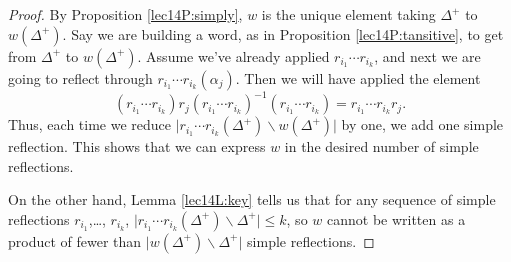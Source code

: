  \begin{proof}
   By Proposition \ref{lec14P:simply}, $w$ is the unique element taking $\Delta^+$ to
   $w(\Delta^+)$. Say we are building a word, as in Proposition
   \ref{lec14P:tansitive}, to get from $\Delta^+$ to $w(\Delta^+)$. Assume we've
   already applied $r_{i_1}\cdots r_{i_k}$, and next we are going to reflect through
   $r_{i_1}\cdots r_{i_k}(\alpha_j)$. Then we will have applied the element
   \[
     (r_{i_1}\cdots r_{i_k})r_j(r_{i_1}\cdots r_{i_k})^{-1} (r_{i_1}\cdots r_{i_k}) = r_{i_1}\cdots
     r_{i_k}r_j.
   \]
   Thus, each time we reduce $\bigr| r_{i_1}\cdots r_{i_k}(\Delta^+)\smallsetminus
   w(\Delta^+)\bigr|$ by one, we add one simple reflection. This shows that we can
   express $w$ in the desired number of simple reflections.

   On the other hand, Lemma \ref{lec14L:key} tells us that for any sequence of simple
   reflections $r_{i_1}$,\dots, $r_{i_k}$, $\bigr| r_{i_1}\cdots
   r_{i_k}(\Delta^+)\smallsetminus \Delta^+\bigr|\le k$, so $w$ cannot be written as a
   product of fewer than $\bigl| w(\Delta^+)\smallsetminus \Delta^+\bigr|$ simple
   reflections.
 \end{proof}

